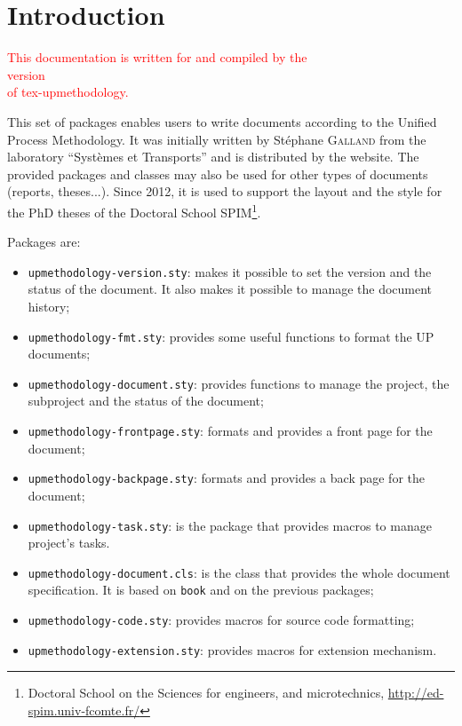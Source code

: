 \documentclass[book]{upmethodology-document}
\begin{document}
\tableofcontents

\listoffigures

\listoftables


\chapter{Introduction}

\begin{center}
\textcolor{red}{\large This documentation is written for and compiled by the\\version \UPMVERSION\\of tex-upmethodology.}
\end{center}

This set of packages enables users to write documents according to the Unified Process Methodology. It was initially written by St\'ephane \textsc{Galland} from the laboratory ``Syst\`emes et Transports'' and is distributed by the \arakhneorg website.
The provided packages and classes may also be used for other types of documents (reports, theses...). Since 2012, it is used to support the layout and the style for the PhD theses of the Doctoral School SPIM\footnote{Doctoral School on the Sciences for engineers, and microtechnics, \href{http://ed-spim.univ-fcomte.fr/}{http://ed-spim.univ-fcomte.fr/}}.

Packages are:
\begin{itemize}
\item \texttt{upmethodology-version.sty}: makes it possible to set the version and the status of the document. It also makes it possible to manage the document history;
\item \texttt{upmethodology-fmt.sty}: provides some useful functions to format the UP documents;
\item \texttt{upmethodology-document.sty}: provides functions to manage the project, the subproject and the status of the document;
\item \texttt{upmethodology-frontpage.sty}: formats and provides a front page for the document;
\item \texttt{upmethodology-backpage.sty}: formats and provides a back page for the document;
\item \texttt{upmethodology-task.sty}: is the \LaTeXe\xspace package that provides macros to manage project's tasks.
\item \texttt{upmethodology-document.cls}: is the \LaTeXe\xspace class that provides the whole document specification. It is based on \texttt{book} and on the previous packages;
\item \texttt{upmethodology-code.sty}: provides macros for source code formatting;
\item \texttt{upmethodology-extension.sty}: provides macros for extension mechanism.
\end{itemize}
\end{document}
